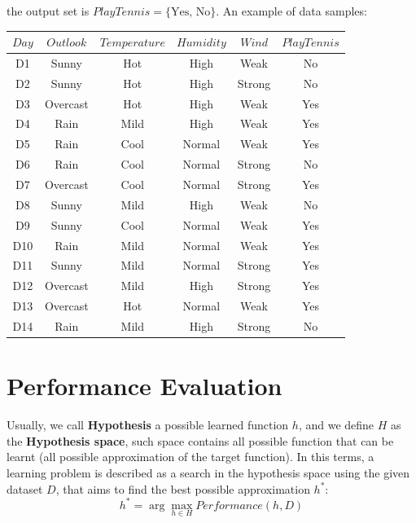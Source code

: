 \documentclass[10pt, letterpaper]{report}
\begin{document}
the output set is $PlayTennis=\{\text{Yes, No}\}$. An example of data samples:\begin{center}
	\begin{tabular}{cccccc}
		\toprule
		$Day$ & $Outlook$ & $Temperature$ & $Humidity$ & $Wind$ & $PlayTennis$ \\
		\midrule
		D1    & Sunny     & Hot           & High       & Weak   & No           \\
		D2    & Sunny     & Hot           & High       & Strong & No           \\
		D3    & Overcast  & Hot           & High       & Weak   & Yes          \\
		D4    & Rain      & Mild          & High       & Weak   & Yes          \\
		D5    & Rain      & Cool          & Normal     & Weak   & Yes          \\
		D6    & Rain      & Cool          & Normal     & Strong & No           \\
		D7    & Overcast  & Cool          & Normal     & Strong & Yes          \\
		D8    & Sunny     & Mild          & High       & Weak   & No           \\
		D9    & Sunny     & Cool          & Normal     & Weak   & Yes          \\
		D10   & Rain      & Mild          & Normal     & Weak   & Yes          \\
		D11   & Sunny     & Mild          & Normal     & Strong & Yes          \\
		D12   & Overcast  & Mild          & High       & Strong & Yes          \\
		D13   & Overcast  & Hot           & Normal     & Weak   & Yes          \\
		D14   & Rain      & Mild          & High       & Strong & No           \\
		\bottomrule
	\end{tabular}
\end{center}
\section{Performance Evaluation}
Usually, we call \textbf{Hypothesis} a possible learned function $h$, and we define $H$ as the \textbf{Hypothesis space}, such space contains all possible function that can be learnt (all possible approximation of the target function). In this terms, a learning problem is described as a search in the hypothesis space using the given dataset $D$, that aims to find the best possible approximation $h^*$:\begin{equation}\label{sol_hypothesis}
	h^*=\arg \max_{h\in H} Performance(h,D)
\end{equation}
\end{document}
